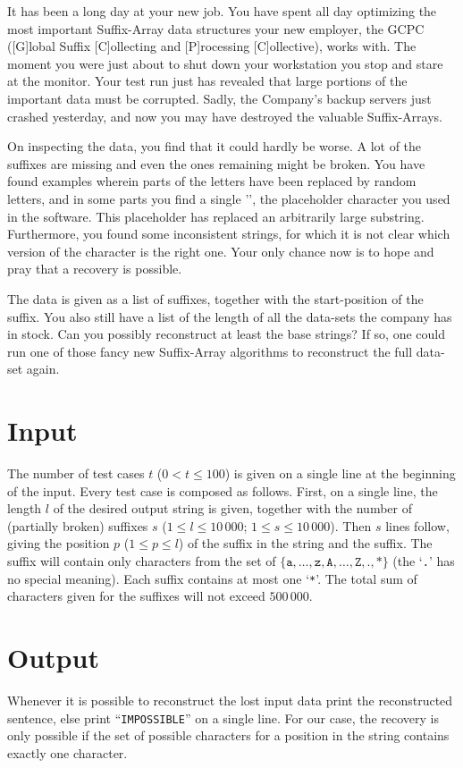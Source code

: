 
It has been a long day at your new job.
You have spent all day optimizing the most important Suffix-Array data structures your new employer, the GCPC ([G]lobal Suffix [C]ollecting and [P]rocessing [C]ollective), works with.
The moment you were just about to shut down your workstation you stop and stare at the monitor.
Your test run just has revealed that large portions of the important data must be corrupted.
Sadly, the Company's backup servers just crashed yesterday, and now you may have destroyed the valuable Suffix-Arrays.

On inspecting the data, you find that it could hardly be worse. A lot of the suffixes are missing and even the ones remaining might be broken.
You have found examples wherein parts of the letters have been replaced by random letters, and in some parts you find a single '{\tt *}', the placeholder character you used in the software.
This placeholder has replaced an arbitrarily large substring. Furthermore, you
found some inconsistent strings, for which it is not clear which version of the
character is the right one.
Your only chance now is to hope and pray that a recovery is possible.

The data is given as a list of suffixes, together with the start-position of the suffix. You also still have a list of the length of all the data-sets the company has in stock.
Can you possibly reconstruct at least the base strings? If so, one could run one of those fancy new Suffix-Array algorithms to reconstruct the full data-set again.

\section*{Input}
The number of test cases $t$ ($0 < t \le 100$) is given on a single line at the beginning of the input.
Every test case is composed as follows.
First, on a single line, the length $l$ of the desired output string is given, together with the number of (partially broken) suffixes $s$ ($1 \leq l \leq 10\,000$; $1 \leq s \leq 10\,000$).
Then $s$ lines follow, giving the position $p$ ($1 \leq p \leq l$) of the suffix in the string and the suffix.
The suffix will contain only characters from the set of $\{\texttt{a},\ldots,\texttt{z},\texttt{A},\ldots,\texttt{Z},\texttt{.},\texttt{*}\}$ (the `\texttt{.}' has no special meaning).  Each suffix contains at most one `\texttt{*}'.
The total sum of characters given for the suffixes will not exceed $500\,000$.

\section*{Output}
Whenever it is possible to reconstruct the lost input data print the reconstructed sentence,
else print ``{\tt IMPOSSIBLE}'' on a single line.
For our case, the recovery is only possible if the set of possible characters for a position in the string contains exactly one character.
